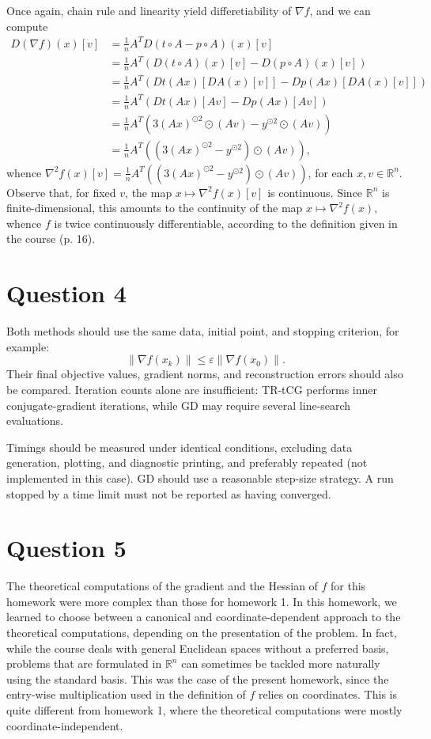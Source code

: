 \documentclass{article}
\theoremstyle{definition}
\theoremstyle{remark}
\newcommand{\R}{\mathbb{R}}
\begin{document}
Once again, chain rule and linearity yield differetiability of $\nabla f$, and we can compute
\begin{align*}
D(\nabla f)(x)[v]
&=\frac{1}{n}A^T
D(t\circ A-p\circ A)(x)[v]\\
&=\frac{1}{n}A^T
\left(D(t\circ A)(x)[v]-D(p\circ A)(x)[v]\right)\\
&=\frac{1}{n}A^T
\left(Dt(Ax)[DA(x)[v]]-Dp(Ax)[DA(x)[v]]\right)\\
&=\frac{1}{n}A^T
\left(Dt(Ax)[Av]-Dp(Ax)[Av]\right)\\
&=\frac{1}{n}A^T
\left(3(Ax)^{\odot 2}\odot(Av)
-y^{\odot 2}\odot(Av)\right)\\
&=\frac{1}{n}A^T
\left(\left(3(Ax)^{\odot 2}-y^{\odot 2}\right)
\odot(Av)\right),
\end{align*}
whence $\nabla^2f(x)[v]=\frac{1}{n}A^T
\left(\left(3(Ax)^{\odot 2}-y^{\odot 2}\right)
\odot(Av)\right)$, for each $x,v\in \R^n$.
Observe that, for fixed $v$, the map $x\mapsto \nabla^2f(x)[v] $ is continuous. Since $\R^n$ is finite-dimensional, this amounts to the continuity of the map $x \mapsto \nabla^2f(x)$, whence $f$ is twice continuously differentiable, according to the definition given in the course (p. 16).

\section*{Question 4}
Both methods should use the same data, initial point, and stopping
criterion, for example:
\[
    \|\nabla f(x_k)\| \leq \varepsilon \|\nabla f(x_0)\|.
\]
Their final objective values, gradient norms, and reconstruction errors should also be compared. Iteration counts alone are insufficient:
TR-tCG performs inner conjugate-gradient iterations, while GD may require several line-search evaluations.

Timings should be measured under identical conditions, excluding data generation, plotting, and diagnostic printing, and preferably repeated (not implemented in this case).
GD should use a reasonable step-size strategy. A run stopped by a time limit must not be reported as having converged.

\section*{Question 5}
The theoretical computations of the gradient and the Hessian of $f$ for this homework were more complex than those for homework 1. 
In this homework, we learned to choose between a canonical and coordinate-dependent approach to the theoretical computations, depending on the presentation of the problem. 
In fact, while the course deals with general Euclidean spaces without a preferred basis, problems that are formulated in $\R^n$ can sometimes be tackled more naturally using the standard basis. This was the case of the present homework, since the entry-wise multiplication used in the definition of $f$ relies on coordinates.  This is quite different from homework 1, where the theoretical computations were mostly coordinate-independent.\bigskip
\end{document}
